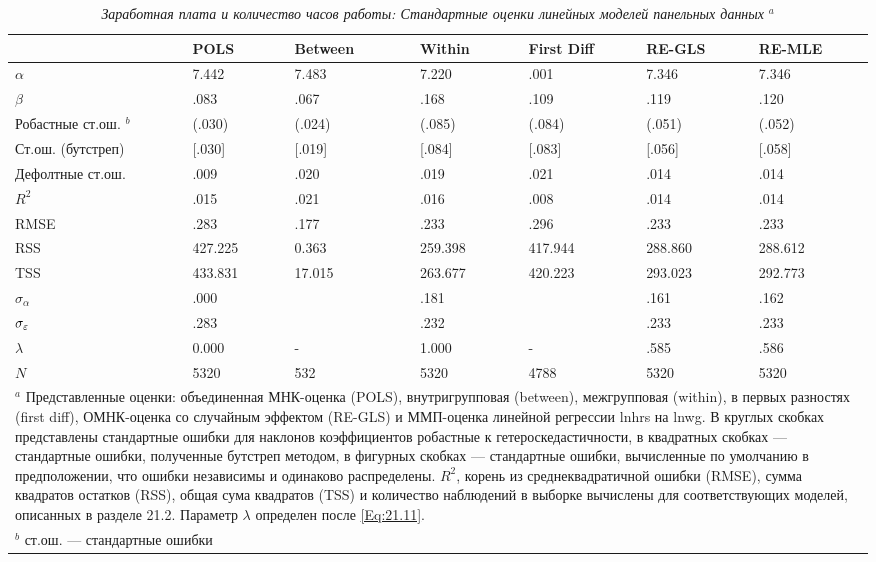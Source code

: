\begin{table}[ht]
\caption{{\it Заработная плата и количество часов работы: Стандартные оценки линейных моделей панельных данных} ${}^a$} 
\centering
\begin{tabular}{p{2cm} p{1.5cm} p{2cm} p{1.6cm} p{2cm} p{2cm} p{2cm}}
\hline \hline
				& \textbf{POLS} &  \textbf{Between} & \textbf{Within} & \textbf{First Diff} & \textbf{RE-GLS} & \textbf{RE-MLE}\\
\hline
$\alpha$ 	& 7.442	& 7.483  & 7.220& .001&  7.346&7.346\\
 $\beta$& .083&.067 &.168 &.109 & .119& .120\\
 Робастные ст.ош. ${}^b$ & (.030)&(.024) &(.085) &(.084) & (.051)&(.052) \\
 Ст.ош. (бутстреп) & [.030] & [.019]& [.084]& [.083]& [.056]&[.058] \\
 Дефолтные ст.ош.&{.009} &{.020} & {.019}& {.021}& {.014}& {.014}\\
\hline
$R^2$& .015 &.021 & .016& .008&.014& .014\\
RMSE & .283& .177&.233&.296 & .233&.233 \\
RSS & 427.225& 0.363& 259.398& 417.944& 288.860 & 288.612\\
TSS & 433.831& 17.015& 263.677& 420.223&293.023 & 292.773\\
$\sigma_{\alpha} $&.000 & & .181& &.161 & .162\\
$\sigma_{\varepsilon}$ & .283& & .232& & .233& .233\\
$\lambda$ & 0.000& -&1.000 &- &.585 &.586 \\
$N$ &5320 & 532& 5320& 4788& 5320& 5320\\
\hline \hline
\multicolumn{7}{p{15cm}}{${}^a$ Представленные оценки: объединенная МНК-оценка (POLS), внутригрупповая (between), межгрупповая (within), в первых разностях (first diff), ОМНК-оценка со случайным эффектом (RE-GLS) и ММП-оценка линейной регрессии lnhrs на lnwg. В круглых скобках представлены стандартные ошибки для наклонов коэффициентов робастные к гетероскедастичности, в квадратных скобках --- стандартные ошибки, полученные бутстреп методом, в фигурных скобках --- стандартные ошибки, вычисленные по умолчанию в предположении, что ошибки независимы и одинаково распределены. $R^2$, корень из среднеквадратичной ошибки (RMSE), сумма квадратов остатков (RSS), общая сума квадратов (TSS) и количество наблюдений в выборке вычислены для соответствующих моделей, описанных в разделе 21.2. Параметр $\lambda$ определен после \ref{Eq:21.11}.} \\
\multicolumn{7}{l}{${}^b$ ст.ош. --- стандартные ошибки}
\end{tabular}
\label{Tab:21.2}
\end{table}

